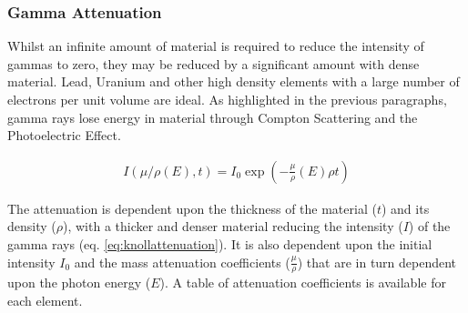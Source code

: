 %



\subsubsection{Gamma Attenuation}

Whilst an infinite amount of material is required to reduce the intensity of gammas to zero, they may be reduced by a significant amount with dense material.  Lead, Uranium and other high density elements with a large number of electrons per unit volume are ideal.  As highlighted in the previous paragraphs, gamma rays lose energy in material through Compton Scattering and the Photoelectric Effect.

\begin{equation}
\begin{split}
I(\mu/\rho(E), t) = I_0 \exp\left(-\frac{\mu}{\rho}(E) \rho t \right)
\end{split}
\label{eq:knollattenuation}
\end{equation}

The attenuation is dependent upon the thickness of the material ($t$) and its density ($\rho$), with a thicker and denser material reducing the intensity ($I$) of the gamma rays (eq. \ref{eq:knollattenuation}\cite{gknollattenuation}).  It is also dependent upon the initial intensity $I_0$ and the mass attenuation coefficients ($\frac{\mu}{\rho}$) that are in turn dependent upon the photon energy ($E$).  A table of attenuation coefficients is available for each element\cite{massattenuation}.



